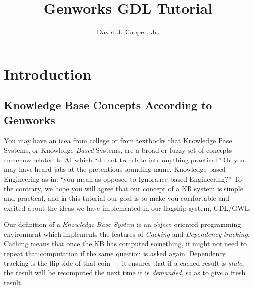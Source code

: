 \documentclass [11pt]{book}
\author {David J. Cooper, Jr.}
\title {Genworks GDL Tutorial}
\begin{document}
\frontmatter



\maketitle



\tableofcontents



\mainmatter



\chapter{Introduction}

\label{chap:introduction}



\section{Knowledge Base Concepts According to Genworks}

\label{sec:knowledgebaseconceptsaccordingtogenworks}

You may have an idea from college or from textbooks that Knowledge Base Systems,
or Knowledge \emph{Based} Systems, are a broad or fuzzy set of concepts somehow related to AI which ``do not translate into anything practical.'' Or you may have heard jabs at the 
pretentious-sounding name, Knowledge-based Engineering as in: ``you mean as opposed to Ignorance-based Engineering?'' To the contrary, we hope you will agree that our concept of a KB system is 
simple and practical, and in this tutorial our goal is to make you comfortable and 
excited about the ideas we have implemented in our flagship system, GDL/GWL. 

Our definition of a \emph{Knowledge Base System} is an object-oriented programming environment which implements the features of \emph{Caching} and \emph{Dependency tracking}. Caching means that once the KB has computed something, it might not need to repeat 
that computation if the same question is asked again. Dependency tracking is the flip side
of that coin --- it ensures that if a cached result is \emph{stale}, the result will be recomputed the next time it is \emph{demanded}, so as to give a fresh result.
\end{document}
